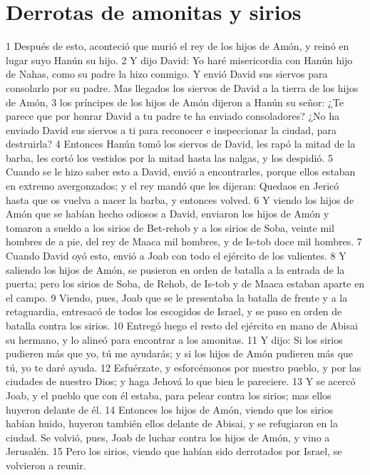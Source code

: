 \section*{Derrotas de amonitas y sirios}
 

1 Después de esto, aconteció que murió el rey de los hijos de Amón, y reinó en lugar suyo Hanún su hijo.
2 Y dijo David: Yo haré misericordia con Hanún hijo de Nahas, como su padre la hizo conmigo. Y envió David sus siervos para consolarlo por su padre. Mas llegados los siervos de David a la tierra de los hijos de Amón,
3 los príncipes de los hijos de Amón dijeron a Hanún su señor: ¿Te parece que por honrar David a tu padre te ha enviado consoladores? ¿No ha enviado David sus siervos a ti para reconocer e inspeccionar la ciudad, para destruirla?
4 Entonces Hanún tomó los siervos de David, les rapó la mitad de la barba, les cortó los vestidos por la mitad hasta las nalgas, y los despidió.
5 Cuando se le hizo saber esto a David, envió a encontrarles, porque ellos estaban en extremo avergonzados; y el rey mandó que les dijeran: Quedaos en Jericó hasta que os vuelva a nacer la barba, y entonces volved.
6 Y viendo los hijos de Amón que se habían hecho odiosos a David, enviaron los hijos de Amón y tomaron a sueldo a los sirios de Bet-rehob y a los sirios de Soba, veinte mil hombres de a pie, del rey de Maaca mil hombres, y de Is-tob doce mil hombres.
7 Cuando David oyó esto, envió a Joab con todo el ejército de los valientes.
8 Y saliendo los hijos de Amón, se pusieron en orden de batalla a la entrada de la puerta; pero los sirios de Soba, de Rehob, de Is-tob y de Maaca estaban aparte en el campo.
9 Viendo, pues, Joab que se le presentaba la batalla de frente y a la retaguardia, entresacó de todos los escogidos de Israel, y se puso en orden de batalla contra los sirios.
10 Entregó luego el resto del ejército en mano de Abisai su hermano, y lo alineó para encontrar a los amonitas.
11 Y dijo: Si los sirios pudieren más que yo, tú me ayudarás; y si los hijos de Amón pudieren más que tú, yo te daré ayuda.
12 Esfuérzate, y esforcémonos por nuestro pueblo, y por las ciudades de nuestro Dios; y haga Jehová lo que bien le pareciere.
13 Y se acercó Joab, y el pueblo que con él estaba, para pelear contra los sirios; mas ellos huyeron delante de él.
14 Entonces los hijos de Amón, viendo que los sirios habían huido, huyeron también ellos delante de Abisai, y se refugiaron en la ciudad. Se volvió, pues, Joab de luchar contra los hijos de Amón, y vino a Jerusalén.
15 Pero los sirios, viendo que habían sido derrotados por Israel, se volvieron a reunir.
